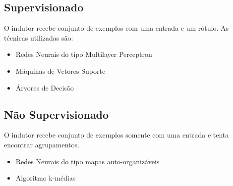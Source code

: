 \documentclass[12pt]{article}
\begin{document}
\subsection{Supervisionado}
O indutor recebe conjunto de exemplos com uma entrada e um rótulo.
As técnicas utilizadas são:
\begin{itemize}
    \item Redes Neurais do tipo Multilayer Perceptron
    \item Máquinas de Vetores Suporte
    \item Árvores de Decisão
\end{itemize}

\subsection{Não Supervisionado}
O indutor recebe conjunto de exemplos somente com uma entrada e tenta encontrar agrupamentos.
\begin{itemize}
    \item Redes Neurais do tipo mapas auto-organizáveis
    \item Algoritmo k-médias
\end{itemize}
\end{document}
